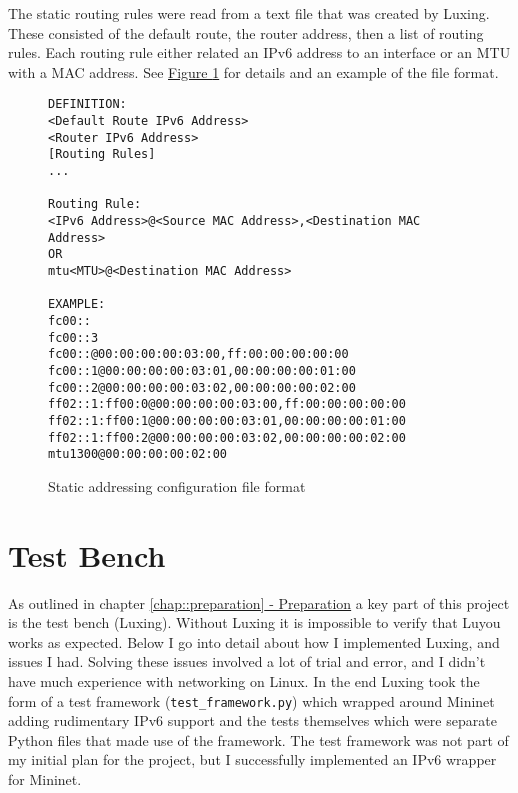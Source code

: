 \documentclass[12pt,a4paper,twoside,openany]{report}
\begin{document}
\bigskip

The static routing rules were read from a text file that was created by Luxing. These consisted of the default route, the router address, then a list of routing rules.  Each routing rule either related an IPv6 address to an interface or an MTU with a MAC address. See \hyperref[fig::config_file]{Figure }\ref{fig::config_file} for details and an example of the file format. 

\begin{figure}
\begin{varwidth}{\linewidth}
\begin{verbatim}
DEFINITION:
<Default Route IPv6 Address>
<Router IPv6 Address>
[Routing Rules]
...

Routing Rule:
<IPv6 Address>@<Source MAC Address>,<Destination MAC Address>
OR
mtu<MTU>@<Destination MAC Address>

EXAMPLE:
fc00::
fc00::3
fc00::@00:00:00:00:03:00,ff:00:00:00:00:00
fc00::1@00:00:00:00:03:01,00:00:00:00:01:00
fc00::2@00:00:00:00:03:02,00:00:00:00:02:00
ff02::1:ff00:0@00:00:00:00:03:00,ff:00:00:00:00:00
ff02::1:ff00:1@00:00:00:00:03:01,00:00:00:00:01:00
ff02::1:ff00:2@00:00:00:00:03:02,00:00:00:00:02:00
mtu1300@00:00:00:00:02:00
\end{verbatim}
\end{varwidth}
\caption{Static addressing configuration file format}
\label{fig::config_file}
\end{figure}

\section{Test Bench}

As outlined in chapter \ref{chap::preparation}\hyperref[chap::preparation]{ - Preparation} a key part of this project is the test bench (Luxing). Without Luxing it is impossible to verify that Luyou works as expected.  Below I go into detail about how I implemented Luxing, and issues I had.  Solving these issues involved a lot of trial and error, and I didn't have much experience with networking on Linux.  In the end Luxing took the form of a test framework (\verb!test_framework.py!) which wrapped around Mininet adding rudimentary IPv6 support and the tests themselves which were separate Python files that made use of the framework. The test framework was not part of my initial plan for the project, but I successfully implemented an IPv6 wrapper for Mininet.

\bigskip
\end{document}
